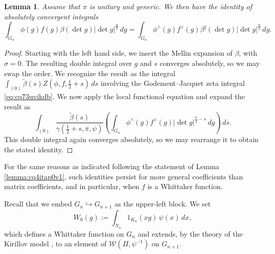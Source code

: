\documentclass[reqno]{amsart}
\theoremstyle{plain}
\newtheorem{lemma}[theorem]{Lemma}
\theoremstyle{definition}
\begin{document}
\begin{lemma}\label{lemma:cq4itbu91o}
  Assume that $\pi$ is unitary and generic.  We then have the identity of absolutely convergent integrals
  \begin{equation}\label{eq:cq4jqjygcl}
    \int_{G_n}
    \phi(g)
    f(g)
    \beta(\det g)
    \lvert \det g \rvert^{\frac{n}{2}}
    \, d g
    =
    \int_{G_n}
    \phi^\wedge(g)
    f^\vee(g)
    \beta^\sharp(\det g) \lvert \det g \rvert^{\frac{n}{2}} \, d g.
  \end{equation}
\end{lemma}
\begin{proof}
  Starting with the left hand side, we insert the Mellin expansion of $\beta$, with $\sigma = 0$.  The resulting double integral over $g$ and $s$ converges absolutely, so we may swap the order.  We recognize the result as the integral $\int_{(0)} \tilde{\beta}(s) Z(\phi, f, \tfrac{1}{2} + s) \, d s$ involving the Godement--Jacquet zeta integral \eqref{eq:cq73uvikdb}.  We now apply the local functional equation and expand the result as
  \begin{equation*}
    \int_{(0)}
    \frac{\tilde{\beta}(s)}{\gamma(\tfrac{1}{2} + s, \pi, \psi)}
    \left(
      \int_{G_n}
      \phi^\wedge(g) f^\vee(g) \lvert \det g \rvert^{\frac{n}{2} - s}
      \, d g
    \right)
    \, d s.
  \end{equation*}
  This double integral again converges absolutely, so we may rearrange it to obtain the stated identity.
\end{proof}
For the same reasons as indicated following the statement of Lemma \ref{lemma:cq4itap0v1}, such identities persist for more general coefficients than matrix coefficients, and in particular, when $f$ is a Whittaker function.


Recall that we embed $G_n \hookrightarrow G_{n + 1}$ as the upper-left block.  We set
\begin{equation}\label{eq:cq4jqk9bz0}
  W_0(g):=\int_{N_n} 1_{K_n}(x g)\,\psi(x)\,d x,
\end{equation}
which defines a Whittaker function on $G_n$ and extends, by the theory of the Kirillov model \cite{MR748505}, to an element of $\mathcal{W}(\Pi,\psi^{-1})$ on $G_{n+1}$.
\end{document}
